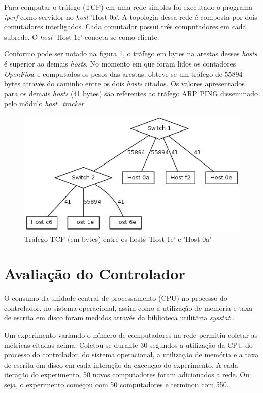 Para computar o tráfego (TCP) em uma rede simples foi executado o programa 
\emph{iperf} como servidor no \emph{host} 'Host 0a'.
A topologia dessa rede é composta por dois comutadores interligados.
Cada comutador possui três computadores em cada subrede.
O \emph{host} 'Host 1e' conecta-se como cliente. 

Conformo pode ser notado na figura \ref{fig:iperf}, o tráfego 
em bytes na arestas desses \emph{hosts} é superior ao demais \emph{hosts}.
No momento em que foram lidos os contadores \emph{OpenFlow} e computados
os pesos das arestas, obteve-se um tráfego de 55894 bytes através do caminho
entre os dois \emph{hosts} citados.
Os valores apresentados para os demais \emph{hosts} (41 bytes) são referentes
ao tráfego ARP PING disseminado pelo módulo \emph{host\_tracker}

\begin{figure}[h!]
    \centering
    \includegraphics[scale=0.8]{img/graph-iperf}
    \caption{Tráfego TCP (em bytes) entre os hosts ’Host 1e’ e ’Host 0a’}
    \label{fig:iperf}
\end{figure}

\section{Avaliação do Controlador}

O consumo da unidade central de processamento (CPU) no processo do controlador,
no sistema operacional, assim como a utilização de memória e taxa de escrita 
em disco foram medidos através da biblioteca utilitária \emph{sysstat} 
\citep{sebastien2015sysstat}.

Um experimento variando o número de computadores na rede permitiu coletar 
as métricas citadas acima.
Coletou-se durante 30 segundos a utilização da CPU do processo do controlador,
do sistema operacional, a utilização de memória e a taxa de escrita em disco
em cada interação da execuçao do experimento.
A cada iteração do experimento, 50 novos computadores foram adicionados a rede.
Ou seja, o experimento começou com 50 computadores e terminou com 550.

